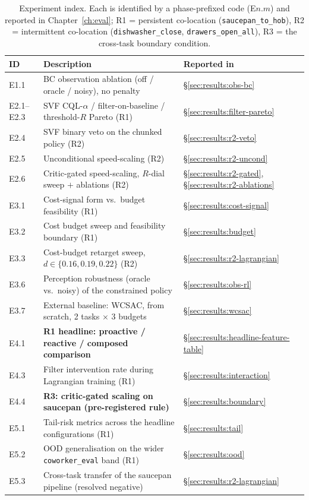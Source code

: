 \documentclass[11pt,a4paper]{report}
\begin{document}
\begin{table}[htbp]
\centering
\caption{Experiment index. Each is identified by a phase-prefixed
code (E$n.m$) and reported in Chapter~\ref{ch:eval}; R1 = persistent
co-location (\texttt{saucepan\_to\_hob}), R2 = intermittent
co-location (\texttt{dishwasher\_close}, \texttt{drawers\_open\_all}),
R3 = the cross-task boundary condition.}
\label{tab:experiment-index}
\small
\begin{tabular}{lll}
\toprule
ID & Description & Reported in \\
\midrule
E1.1   & BC observation ablation (off / oracle / noisy), no penalty
       & \S\ref{sec:results:obs-bc} \\
E2.1--E2.3 & SVF CQL-$\alpha$ / filter-on-baseline / threshold-$R$ Pareto (R1)
       & \S\ref{sec:results:filter-pareto} \\
E2.4   & SVF binary veto on the chunked policy (R2)
       & \S\ref{sec:results:r2-veto} \\
E2.5   & Unconditional speed-scaling (R2)
       & \S\ref{sec:results:r2-uncond} \\
E2.6   & Critic-gated speed-scaling, $R$-dial sweep $+$ ablations (R2)
       & \S\ref{sec:results:r2-gated}, \S\ref{sec:results:r2-ablations} \\
E3.1   & Cost-signal form vs.\ budget feasibility (R1)
       & \S\ref{sec:results:cost-signal} \\
E3.2   & Cost budget sweep and feasibility boundary (R1)
       & \S\ref{sec:results:budget} \\
E3.3   & Cost-budget retarget sweep, $d \in \{0.16, 0.19, 0.22\}$ (R2)
       & \S\ref{sec:results:r2-lagrangian} \\
E3.6   & Perception robustness (oracle vs.\ noisy) of the constrained policy
       & \S\ref{sec:results:obs-rl} \\
E3.7   & External baseline: WCSAC, from scratch, 2 tasks $\times$ 3 budgets
       & \S\ref{sec:results:wcsac} \\
E4.1   & \textbf{R1 headline: proactive / reactive / composed comparison}
       & \S\ref{sec:results:headline-feature-table} \\
E4.3   & Filter intervention rate during Lagrangian training (R1)
       & \S\ref{sec:results:interaction} \\
E4.4   & \textbf{R3: critic-gated scaling on saucepan (pre-registered rule)}
       & \S\ref{sec:results:boundary} \\
E5.1   & Tail-risk metrics across the headline configurations (R1)
       & \S\ref{sec:results:tail} \\
E5.2   & OOD generalisation on the wider \texttt{coworker\_eval} band (R1)
       & \S\ref{sec:results:ood} \\
E5.3   & Cross-task transfer of the saucepan pipeline (resolved negative)
       & \S\ref{sec:results:r2-lagrangian} \\
\bottomrule
\end{tabular}
\end{table}
\end{document}
